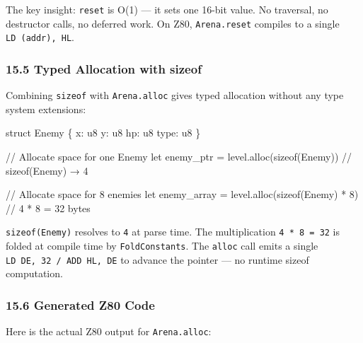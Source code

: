 \documentclass[
  11pt,
]{article}
\newenvironment{Shaded}{}{}
\newcommand{\NormalTok}[1]{#1}
\begin{document}
The key insight: \texttt{reset} is O(1) --- it sets one 16-bit value. No
traversal, no destructor calls, no deferred work. On Z80,
\texttt{Arena.reset} compiles to a single \texttt{LD\ (addr),\ HL}.

\subsubsection{15.5 Typed Allocation with
sizeof}\label{typed-allocation-with-sizeof}

Combining \texttt{sizeof} with \texttt{Arena.alloc} gives typed
allocation without any type system extensions:

\begin{Shaded}
\begin{Highlighting}[]
\NormalTok{struct Enemy \{}
\NormalTok{    x: u8}
\NormalTok{    y: u8}
\NormalTok{    hp: u8}
\NormalTok{    type: u8}
\NormalTok{\}}

\NormalTok{// Allocate space for one Enemy}
\NormalTok{let enemy\_ptr = level.alloc(sizeof(Enemy))   // sizeof(Enemy) → 4}

\NormalTok{// Allocate space for 8 enemies}
\NormalTok{let enemy\_array = level.alloc(sizeof(Enemy) * 8)   // 4 * 8 = 32 bytes}
\end{Highlighting}
\end{Shaded}

\texttt{sizeof(Enemy)} resolves to \texttt{4} at parse time. The
multiplication \texttt{4\ *\ 8\ =\ 32} is folded at compile time by
\texttt{FoldConstants}. The \texttt{alloc} call emits a single
\texttt{LD\ DE,\ 32\ /\ ADD\ HL,\ DE} to advance the pointer --- no
runtime sizeof computation.

\subsubsection{15.6 Generated Z80 Code}\label{generated-z80-code}

Here is the actual Z80 output for \texttt{Arena.alloc}:
\end{document}
